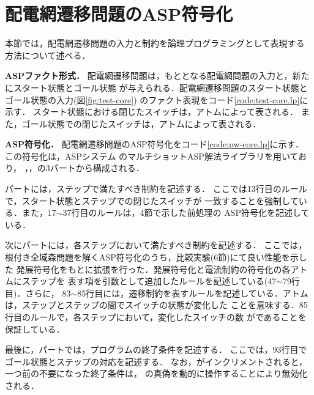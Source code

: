 \section{配電網遷移問題のASP符号化}\label{chap:core}

本節では，配電網遷移問題の入力と制約を論理プログラミングとして表現する
方法について述べる．





\textbf{ASPファクト形式．}
配電網遷移問題は，もととなる配電網問題の入力と，新たにスタート状態とゴール状態
が与えられる．配電網遷移問題のスタート状態とゴール状態の入力(図\ref{fig:test-core})
のファクト表現をコード\ref{code:test-core.lp}に示す．
スタート状態における閉じたスイッチは，アトムによって表される．
また，ゴール状態での閉じたスイッチは，アトムによって表される．

\textbf{ASP符号化．}
配電網遷移問題のASP符号化をコード\ref{code:pw-core.lp}に示す．
この符号化は，ASPシステム \clingo のマルチショットASP解法ライブラリを用いており，
，，の3パートから構成される．

パートには，ステップで満たすべき制約を記述する．
ここでは13行目のルールで，スタート状態とステップでの閉じたスイッチが
一致することを強制している．また，17$\sim$37行目のルールは，4節で示した前処理の
ASP符号化を記述している．

次にパートには，各ステップにおいて満たすべき制約を記述する．
ここでは，根付き全域森問題を解くASP符号化のうち，比較実験(6節)にて良い性能を示した
発展符号化をもとに拡張を行った．発展符号化と電流制約の符号化の各アトムにステップを
表す項を引数として追加したルールを記述している(47$\sim$79行目)．さらに，
83$\sim$85行目には，遷移制約を表すルールを記述している．アトム
は，ステップとステップの間でスイッチの状態が変化した
ことを意味する．85行目のルールで，各ステップにおいて，変化したスイッチの数
がであることを保証している．

最後に，パートでは，プログラムの終了条件を記述する．
ここでは，93行目でゴール状態とステップの対応を記述する．
なお，がインクリメントされると，一つ前の不要になった終了条件は，
の真偽を動的に操作することにより無効化される．





